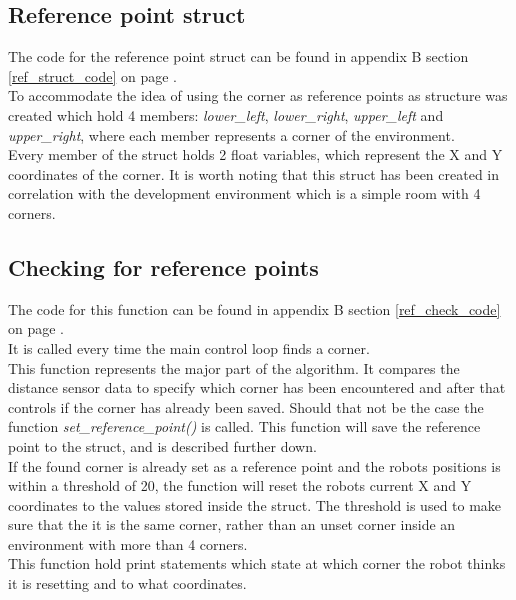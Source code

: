 \subsection{Reference point struct}
\label{ref_struct_description}
The code for the reference point struct can be found in appendix B section \ref{ref_struct_code} on page \pageref{ref_struct_code}.\\
To accommodate the idea of using the corner as reference points as structure was created which hold 4 members: \textit{lower\_left}, \textit{lower\_right}, \textit{upper\_left} and \textit{upper\_right}, where each member represents a corner of the environment. \\
Every member of the struct holds 2 float variables, which represent the X and Y coordinates of the corner.
It is worth noting that this struct has been created in correlation with the development environment which is a simple room with 4 corners.

\subsection{Checking for reference points}
\label{ref_check_description}
The code for this function can be found in appendix B section \ref{ref_check_code} on page \pageref{ref_check_code}.\\
It is called every time the main control loop finds a corner. \\
This function represents the major part of the algorithm. It compares the distance sensor data to specify which corner has been encountered and after that controls if the corner has already been saved.
Should that not be the case the function \textit{set\_reference\_point()} is called. This function will save the reference point to the struct, and is described further down. \\
If the found corner is already set as a reference point and the robots positions is within a threshold of 20, the function will reset the robots current X and Y coordinates to the values stored inside the struct. The threshold is used to make sure that the it is the same corner, rather than an unset corner inside an environment with more than 4 corners. \\
This function hold print statements which state at which corner the robot thinks it is resetting and to what coordinates.

